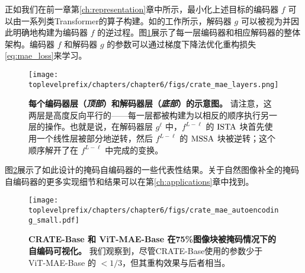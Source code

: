 \documentclass[../../book-main.tex]{subfiles}
\begin{document}
正如我们在前一章第\ref{ch:representation}章中所示，最小化上述目标的编码器 $f$ 可以由一系列类Transformer的算子构建。如\cite{Pai2024masked}的工作所示，解码器 $g$ 可以被视为并因此明确地构建为编码器 $f$ 的逆过程。图\ref{fig:crate_mae_layers}展示了每一层编码器和相应解码器的整体架构。编码器 $f$ 和解码器 $g$ 的参数可以通过梯度下降法优化重构损失\eqref{eq:mae_loss}来学习。

\begin{figure}[t!]
\centering
\texttt{[image: \\toplevelprefix/chapters/chapter6/figs/crate\_mae\_layers.png]}
\caption{\small \textbf{每个编码器层（\textit{顶部}）和解码器层（\textit{底部}）的示意图。} 请注意，这两层是高度反向平行的——每一层都被构建为以相反的顺序执行另一层的操作。也就是说，在解码器层 \(g^{\ell}\) 中，\(f^{L - \ell}\) 的 \(\operatorname{ISTA}\) 块首先使用一个线性层被部分地逆转，然后 \(f^{L - \ell}\) 的 \(\operatorname{MSSA}\) 块被逆转；这个顺序解开了在 \(f^{L - \ell}\) 中完成的变换。}
\label{fig:crate_mae_layers}
\end{figure}

图\ref{fig:mae_autoencoding-small}展示了如此设计的掩码自编码器的一些代表性结果。关于自然图像补全的掩码自编码器的更多实现细节和结果可以在第\ref{ch:applications}章中找到。
\begin{figure}[t]
\centering
\texttt{[image: \\toplevelprefix/chapters/chapter6/figs/crate\_mae\_autoencoding\_small.pdf]}
\caption{\small \textbf{CRATE-Base 和 ViT-MAE-Base \cite{he2022masked} 在75\%图像块被掩码情况下的自编码可视化。} 我们观察到，尽管CRATE-Base使用的参数少于 ViT-MAE-Base 的 \(< 1/3\)，但其重构效果与后者相当。
}
\label{fig:mae_autoencoding-small}
\end{figure}



\end{document}
